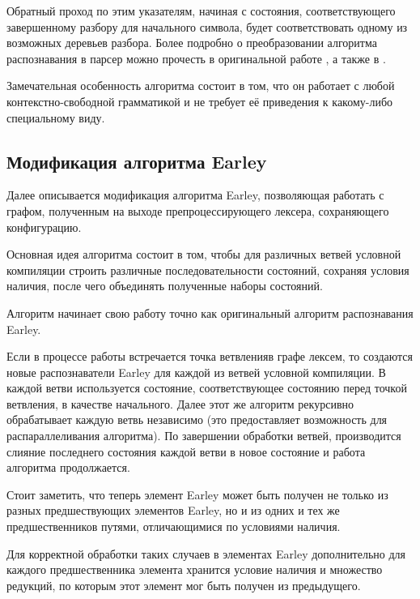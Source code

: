 Обратный проход по этим указателям, начиная с состояния, соответствующего завершенному разбору для начального символа, будет соответствовать одному из возможных деревьев разбора. Более подробно о преобразовании алгоритма распознавания в парсер можно прочесть в оригинальной работе \cite{earley68}, а также в \cite{recognizertoparser}.

Замечательная особенность алгоритма состоит в том, что он работает с любой контекстно-свободной грамматикой и не требует её приведения к какому-либо специальному виду.

\subsection{Модификация алгоритма Earley}
\label{subsec:earleymodification}


Далее описывается модификация алгоритма Earley, позволяющая работать с графом, полученным на выходе препроцессирующего лексера, сохраняющего конфигурацию. 

Основная идея алгоритма состоит в том, чтобы для различных ветвей условной компиляции строить различные последовательности состояний, сохраняя условия наличия, после чего объединять полученные наборы состояний.

Алгоритм начинает свою работу точно как оригинальный алгоритм распознавания Earley.

Если в процессе работы встречается точка ветвленияв графе лексем, то создаются новые распознаватели Earley для каждой из ветвей условной компиляции. В каждой ветви используется состояние, соответствующее состоянию перед точкой ветвления, в качестве начального. Далее этот же алгоритм рекурсивно обрабатывает каждую ветвь независимо (это предоставляет возможность для распараллеливания алгоритма). По завершении обработки ветвей, производится слияние последнего состояния каждой ветви в новое состояние и работа алгоритма продолжается.

Стоит заметить, что теперь элемент Earley может быть получен не только из разных предшествующих элементов Earley, но и из одних и тех же предшественников путями, отличающимися по условиями наличия.

Для корректной обработки таких случаев в элементах Earley дополнительно для каждого предшественника элемента хранится условие наличия и множество редукций, по которым этот элемент мог быть получен из предыдущего.

